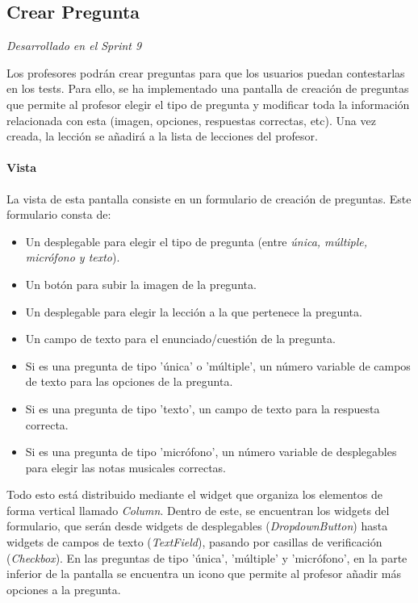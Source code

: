 \newpage
\subsection{Crear Pregunta} 

\textit{Desarrollado en el Sprint 9}

Los profesores podrán crear preguntas para que los usuarios puedan contestarlas en los tests. Para ello, se ha implementado una pantalla de creación de preguntas que permite al profesor elegir el tipo de pregunta y modificar toda la información relacionada con esta (imagen, opciones, respuestas correctas, etc). Una vez creada, la lección se añadirá a la lista de lecciones del profesor.



\paragraph*{Vista}
La vista de esta pantalla consiste en un formulario de creación de preguntas. Este formulario consta de:
\begin{itemize}
  \item Un desplegable para elegir el tipo de pregunta (entre \textit{única, múltiple, micrófono y texto}).
  \item Un botón para subir la imagen de la pregunta.
  \item Un desplegable para elegir la lección a la que pertenece la pregunta.
  \item Un campo de texto para el enunciado/cuestión de la pregunta.
  \item Si es una pregunta de tipo 'única' o 'múltiple', un número variable de campos de texto para las opciones de la pregunta.
  \item Si es una pregunta de tipo 'texto', un campo de texto para la respuesta correcta.
  \item Si es una pregunta de tipo 'micrófono', un número variable de desplegables para elegir las notas musicales correctas.
\end{itemize}




Todo esto está distribuido mediante el widget que organiza los elementos de forma vertical llamado \textit{Column}. Dentro de este, se encuentran los widgets del formulario, que serán desde widgets de desplegables (\textit{DropdownButton}) hasta widgets de campos de texto (\textit{TextField}), pasando por casillas de verificación (\textit{Checkbox}).
En las preguntas de tipo 'única', 'múltiple' y 'micrófono', en la parte inferior de la pantalla se encuentra un icono que permite al profesor añadir más opciones a la pregunta.

